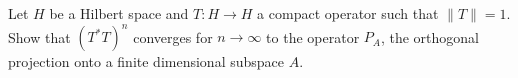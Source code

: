 Let $H$ be a Hilbert space and $T:H\rightarrow H$ a compact operator
such that $\|T\|=1$. Show that $(T^*T)^n$ converges for $n\rightarrow
\infty$ to the operator $P_A$, the orthogonal projection onto a finite
dimensional subspace $A$.
